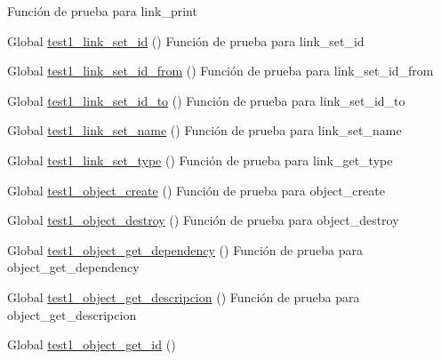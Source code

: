 \begin{DoxyRefList}
%
Función de prueba para link\+\_\+print  
\item[Global \mbox{\hyperlink{link__test_8c_ac2b67785fdf6bb85af93e985af9ee3f2}{test1\+\_\+link\+\_\+set\+\_\+id}} ()]\label{test__test000105}%
%
Función de prueba para link\+\_\+set\+\_\+id  
\item[Global \mbox{\hyperlink{link__test_8c_aa6eda3bccff919587300e46d954aa7bf}{test1\+\_\+link\+\_\+set\+\_\+id\+\_\+from}} ()]\label{test__test000115}%
%
Función de prueba para link\+\_\+set\+\_\+id\+\_\+from  
\item[Global \mbox{\hyperlink{link__test_8c_a17a011e05162c041e83e703565bf45f0}{test1\+\_\+link\+\_\+set\+\_\+id\+\_\+to}} ()]\label{test__test000120}%
%
Función de prueba para link\+\_\+set\+\_\+id\+\_\+to  
\item[Global \mbox{\hyperlink{link__test_8c_ae0e478a0540bed26befc071591e3ff6c}{test1\+\_\+link\+\_\+set\+\_\+name}} ()]\label{test__test000110}%
%
Función de prueba para link\+\_\+set\+\_\+name  
\item[Global \mbox{\hyperlink{link__test_8c_a4cc1e4af5b00042089379c6d2236f8e8}{test1\+\_\+link\+\_\+set\+\_\+type}} ()]\label{test__test000125}%
%
Función de prueba para link\+\_\+get\+\_\+type  
\item[Global \mbox{\hyperlink{object__test_8c_a3836d69f92ce7149d56bafcaec83f516}{test1\+\_\+object\+\_\+create}} ()]\label{test__test000130}%
%
Función de prueba para object\+\_\+create  
\item[Global \mbox{\hyperlink{object__test_8c_a498384b62d11142a84e4a95bc12c42bc}{test1\+\_\+object\+\_\+destroy}} ()]\label{test__test000132}%
%
Función de prueba para object\+\_\+destroy  
\item[Global \mbox{\hyperlink{object__test_8c_aff882e9769d27a86bd3ede47c1be29d4}{test1\+\_\+object\+\_\+get\+\_\+dependency}} ()]\label{test__test000167}%
%
Función de prueba para object\+\_\+get\+\_\+dependency  
\item[Global \mbox{\hyperlink{object__test_8c_add91560989a3b9cada34364a6abd7ac3}{test1\+\_\+object\+\_\+get\+\_\+descripcion}} ()]\label{test__test000143}%
%
Función de prueba para object\+\_\+get\+\_\+descripcion  
\item[Global \mbox{\hyperlink{object__test_8c_aa88e9e9dab92ba9c58851d7a7a8415f0}{test1\+\_\+object\+\_\+get\+\_\+id}} ()]\label{test__test000134}%

\end{DoxyRefList}
